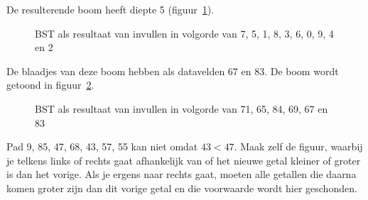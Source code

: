 \begin{Oplossing}{4.11}
De resulterende boom heeft diepte 5 (figuur~\ref{fig:herhoefBST3}).
\begin{figure}[htbp]
    \centering
{}
\caption{BST als resultaat van invullen in volgorde van 7, 5, 1, 8, 3, 6, 0, 9, 4 en 2}
    \label{fig:herhoefBST3}
\end{figure}
\end{Oplossing}
\begin{Oplossing}{4.12}
De blaadjes van deze boom hebben als datavelden 67 en 83. De boom wordt getoond in figuur~\ref{fig:herhoefBST4}.
\begin{figure}[htbp]
    \centering
{}
\caption{BST als resultaat van invullen in volgorde van 71, 65, 84, 69, 67 en 83}
    \label{fig:herhoefBST4}
\end{figure}
\end{Oplossing}
\begin{Oplossing}{4.13}
Pad 9, 85, 47, 68, 43, 57, 55 kan niet omdat $43 < 47$. Maak zelf de figuur, waarbij je telkens links of rechts gaat afhankelijk van of het nieuwe getal kleiner of groter is dan het vorige. Als je ergens naar rechts gaat, moeten alle getallen die daarna komen groter zijn dan dit vorige getal en die voorwaarde wordt hier geschonden.
\end{Oplossing}
